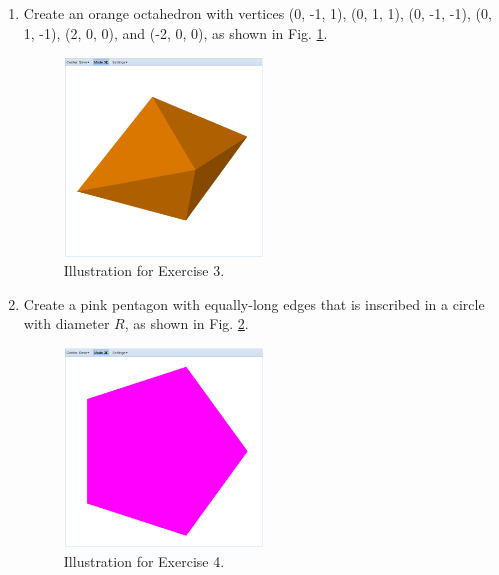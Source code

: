 \documentclass{article}
\begin{document}
\begin{enumerate}
\item Create an orange octahedron with vertices 
(0, -1, 1), (0, 1, 1), (0, -1, -1), (0, 1, -1), (2, 0, 0), and (-2, 0, 0), 
as shown in Fig. \ref{fig:a3}.

\begin{figure}[!ht]
\begin{center}
\includegraphics[width=0.5\textwidth]{img/a3-orange-octahedron.png}
\end{center}
\vspace{-2mm}
\caption{Illustration for Exercise 3.}
\label{fig:a3}
\end{figure}

\item Create a pink pentagon with equally-long edges that is inscribed 
in a circle with diameter $R$, as shown in Fig. \ref{fig:a4}.

\begin{figure}[!ht]
\begin{center}
\includegraphics[width=0.5\textwidth]{img/a4-pink-pentagon.png}
\end{center}
\vspace{-4mm}
\caption{Illustration for Exercise 4.}
\label{fig:a4}
\end{figure}
\newpage


\end{enumerate}
\end{document}
